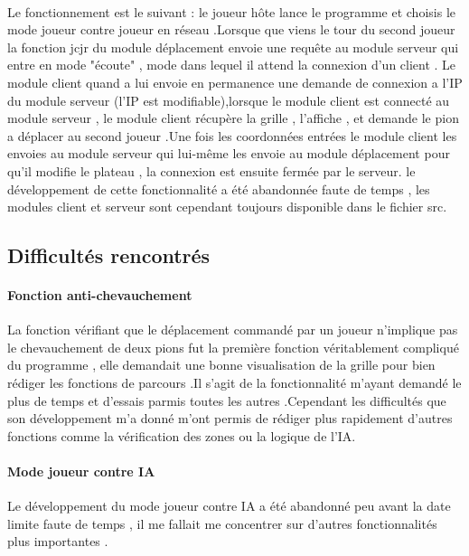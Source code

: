\documentclass[a4paper,12pt]{article}
\begin{document}
\paragraph{}
Le fonctionnement est le suivant : le joueur hôte lance le programme et choisis le mode joueur contre joueur en réseau .Lorsque que viens le tour du second joueur la fonction jcjr du module déplacement envoie une requête au module serveur qui entre en mode "écoute" , mode dans lequel il attend la connexion d'un client .
\newline
Le module client quand a lui envoie en permanence une demande de connexion a l'IP du module serveur (l'IP est modifiable),lorsque le module client est connecté au module serveur , le module client récupère la grille , l'affiche , et demande le pion a déplacer au second joueur .Une fois les coordonnées entrées le module client les envoies au module serveur qui lui-même les envoie au module déplacement pour qu'il modifie le plateau , la connexion est ensuite fermée par le serveur.
\newline le développement de cette fonctionnalité a été abandonnée faute de temps , les modules client et serveur sont cependant toujours disponible dans le fichier src.
\newpage
\begin{center}
\section{Difficultés rencontrés}
\end{center}
\vspace{2cm}

\paragraph{Fonction anti-chevauchement}
La fonction vérifiant que le déplacement commandé par un joueur n'implique pas le chevauchement de deux pions fut la première fonction véritablement compliqué du programme , elle demandait une bonne visualisation de la grille pour bien rédiger les fonctions de parcours .Il s'agit de la fonctionnalité m'ayant demandé le plus de temps et d'essais parmis toutes les autres .Cependant les difficultés que son développement m'a donné m'ont permis de rédiger plus rapidement d'autres fonctions comme la vérification des zones ou la logique de l'IA.
\newline
\newline
\paragraph{Mode joueur contre IA}
Le développement du mode joueur contre IA a été abandonné peu avant la date limite faute de temps , il me fallait me concentrer sur d'autres fonctionnalités plus importantes .
\newline
\newline
\end{document}
